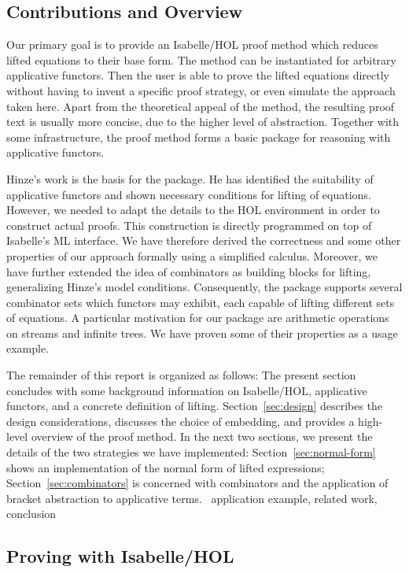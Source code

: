 \subsection{Contributions and Overview}\label{subsec:contrib-overview}

Our primary goal is to provide an Isabelle/HOL proof method which reduces
lifted equations to their base form.
The method can be instantiated for arbitrary applicative functors.
Then the user is able to prove the lifted equations directly without having to
invent a specific proof strategy, or even simulate the approach taken here.
Apart from the theoretical appeal of the method, the resulting proof text is
usually more concise, due to the higher level of abstraction.
Together with some infrastructure, the proof method forms a basic package
for reasoning with applicative functors.

Hinze's work is the basis for the package.
He has identified the suitability of applicative functors and shown
necessary conditions for lifting of equations.
However, we needed to adapt the details to the HOL environment in order to
construct actual proofs.
This construction is directly programmed on top of Isabelle's ML interface.
We have therefore derived the correctness and some other properties of our
approach formally using a simplified calculus.
Moreover, we have further extended the idea of combinators as building blocks
for lifting, generalizing Hinze's model conditions.
Consequently, the package supports several combinator sets which functors may
exhibit, each capable of lifting different sets of equations.
A particular motivation for our package are arithmetic operations on streams
and infinite trees.
We have proven some of their properties as a usage example.

The remainder of this report is organized as follows:
The present section concludes with some background information on Isabelle/HOL,
applicative functors, and a concrete definition of lifting.
Section~\ref{sec:design} describes the design considerations, discusses the
choice of embedding, and provides a high-level overview of the proof method.
In the next two sections, we present the details of the two strategies we
have implemented:
Section~\ref{sec:normal-form} shows an implementation of the normal form of
lifted expressions;
Section~\ref{sec:combinators} is concerned with combinators and the application
of bracket abstraction to applicative terms.
\todo\ application example, related work, conclusion


\subsection{Proving with Isabelle/HOL}\label{subsec:isabelle}


